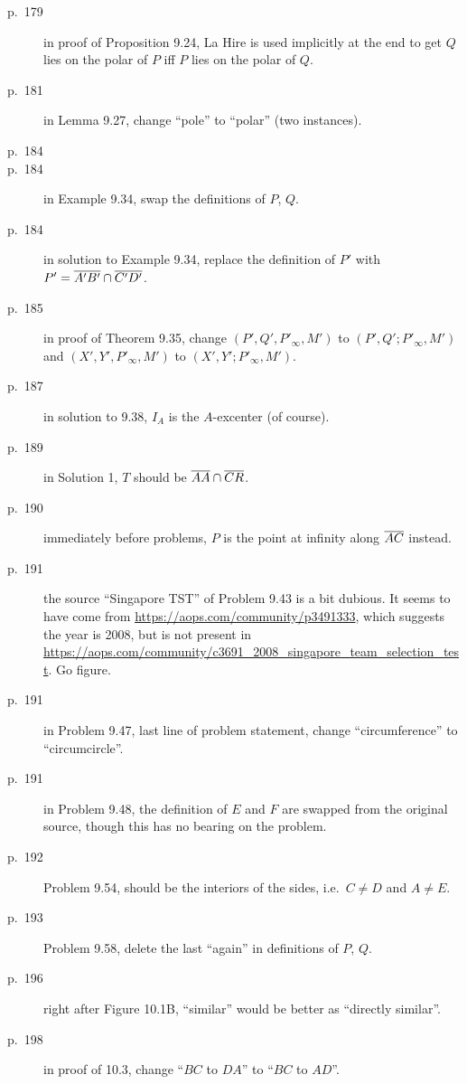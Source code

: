 \documentclass[11pt]{scrartcl}
\begin{document}
\begin{description}
\item[p.\  179] in proof of Proposition 9.24, La Hire is used implicitly at the end
  to get $Q$ lies on the polar of $P$ iff $P$ lies on the polar of $Q$.
\item[p.\  181] in Lemma 9.27, change ``pole'' to ``polar'' (two instances).
\item[p.\  184] 
\item[p.\  184] in Example 9.34, swap the definitions of $P$, $Q$.
\item[p.\  184] in solution to Example 9.34,
  replace the definition of $P'$ with $P' = \overline{A'B'} \cap \overline{C'D'}$.
\item[p.\  185] in proof of Theorem 9.35, change
  $(P', Q', P'_\infty, M')$ to $(P', Q'; P'_\infty, M')$
  and $(X', Y', P'_\infty, M')$ to $(X', Y'; P'_\infty, M')$.
\item[p.\  187] in solution to 9.38, $I_A$ is the $A$-excenter (of course).
\item[p.\  189] in Solution 1, $T$ should be $\overline{AA} \cap \overline{CR}$.
\item[p.\  190] immediately before problems, $P$ is the point at infinity along $\overline{AC}$ instead.
\item[p.\  191] the source ``Singapore TST'' of Problem 9.43 is a bit dubious.
  It seems to have come from \url{https://aops.com/community/p3491333},
  which suggests the year is 2008,
  but is not present in \url{https://aops.com/community/c3691_2008_singapore_team_selection_test}.
  Go figure.
\item[p.\  191] in Problem 9.47, last line of problem statement,
  change ``circumference'' to ``circumcircle''.
\item[p.\  191] in Problem 9.48, the definition of $E$ and $F$ are swapped from
  the original source, though this has no bearing on the problem.
\item[p.\  192] Problem 9.54, should be the interiors of the sides, i.e.\ $C \neq D$ and $A \neq E$.
\item[p.\  193] Problem 9.58, delete the last ``again'' in definitions of $P$, $Q$.
\item[p.\  196] right after Figure 10.1B, ``similar'' would be better as ``directly similar''.
\item[p.\  198] in proof of 10.3, change ``$BC$ to $DA$'' to ``$BC$ to $AD$''.

\end{description}
\end{document}
